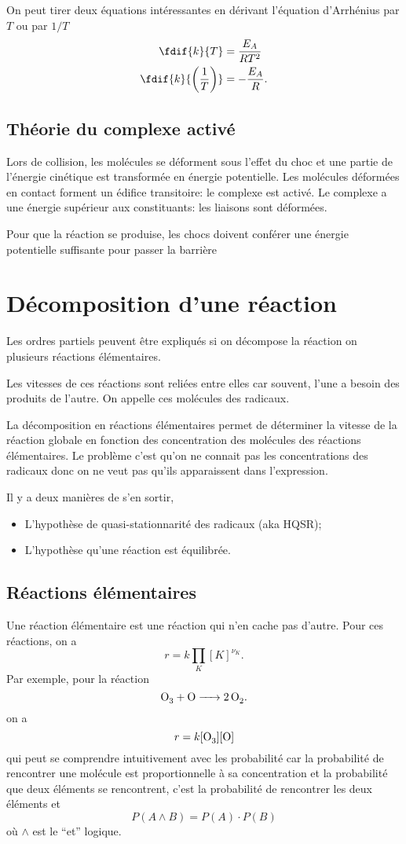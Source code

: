 On peut tirer deux équations intéressantes en dérivant
l'équation d'Arrhénius par $T$ ou par $1/T$
\begin{align*}
  \fdif{k}{T} & = \frac{E_A}{RT^2}\\
  \fdif{k}{\left(\frac{1}{T}\right)} & = -\frac{E_A}{R}.
\end{align*}

\subsection{Théorie du complexe activé}
Lors de collision, les molécules se déforment sous l'effet du choc et
une partie de l'énergie cinétique est transformée en énergie potentielle.
Les molécules déformées en contact forment un édifice transitoire:
le complexe est activé.
Le complexe a une énergie supérieur aux constituants:
les liaisons sont déformées.

Pour que la réaction se produise,
les chocs doivent conférer une énergie potentielle
suffisante pour passer la barrière

\section{Décomposition d'une réaction}
Les ordres partiels peuvent être expliqués si on décompose
la réaction on plusieurs réactions élémentaires.

Les vitesses de ces réactions sont reliées entre elles car souvent,
l'une a besoin des produits de l'autre.
On appelle ces molécules des radicaux.

La décomposition en réactions élémentaires permet de déterminer
la vitesse de la réaction globale en fonction des concentration
des molécules des réactions élémentaires.
Le problème c'est qu'on ne connait pas les concentrations
des radicaux donc on ne veut pas qu'ils apparaissent dans l'expression.

Il y a deux manières de s'en sortir,
\begin{itemize}
  \item L'hypothèse de quasi-stationnarité des radicaux (aka HQSR);
  \item L'hypothèse qu'une réaction est équilibrée.
\end{itemize}

\subsection{Réactions élémentaires}
Une réaction élémentaire est une réaction qui n'en cache pas d'autre.
Pour ces réactions, on a
\[ r = k \prod_K [K]^{\nu_K}. \]
Par exemple, pour la réaction
\[ \ce{O3 + O -> 2O2}. \]
on a
\[ r = k[\ce{O3}][\ce{O}] \]
qui peut se comprendre intuitivement avec les probabilité car
la probabilité de rencontrer une molécule est proportionnelle à
sa concentration et la probabilité que deux éléments se rencontrent,
c'est la probabilité de rencontrer les deux éléments et
\[ P(A \land B) = P(A) \cdot P(B) \]
où $\land$ est le ``et'' logique.

